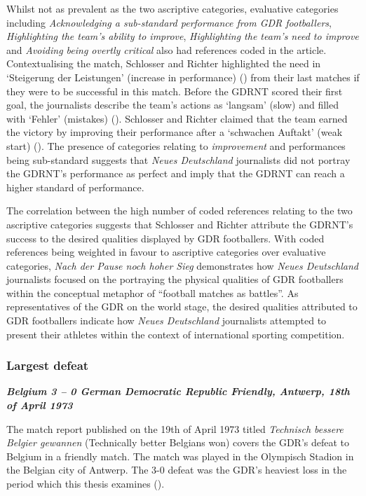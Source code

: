 Whilst not as prevalent as the two ascriptive categories, evaluative categories including \textit{Acknowledging a sub-standard performance from GDR footballers}, \textit{Highlighting the team’s ability to improve}, \textit{Highlighting the team’s need to improve} and \textit{Avoiding being overtly critical} also had references coded in the article. Contextualising the match, Schlosser and Richter highlighted the need in ‘Steigerung der Leistungen’ (increase in performance) (\cite{nd19721008}) from their last matches if they were to be successful in this match. Before the GDRNT scored their first goal, the journalists describe the team’s actions as ‘langsam’ (slow) and filled with ‘Fehler’ (mistakes) (\cite{nd19721008}). Schlosser and Richter claimed that the team earned the victory by improving their performance after a ‘schwachen Auftakt’ (weak start) (\cite{nd19721008}). The presence of categories relating to \textit{improvement} and performances being sub-standard suggests that \textit{Neues Deutschland} journalists did not portray the GDRNT’s performance as perfect and imply that the GDRNT can reach a higher standard of performance.

The correlation between the high number of coded references relating to the two ascriptive categories suggests that Schlosser and Richter attribute the GDRNT’s success to the desired qualities displayed by GDR footballers. With coded references being weighted in favour to ascriptive categories over evaluative categories, \textit{Nach der Pause noch hoher Sieg} demonstrates how \textit{Neues Deutschland} journalists focused on the portraying the physical qualities of GDR footballers within the conceptual metaphor of “football matches as battles”. As representatives of the GDR on the world stage, the desired qualities attributed to GDR footballers indicate how \textit{Neues Deutschland} journalists attempted to present their athletes within the context of international sporting competition.

\subsubsection*{Largest defeat}

\textbf{\textit{Belgium 3 – 0 German Democratic Republic
\newline Friendly, Antwerp, 18th of April 1973}}

The match report published on the 19th of April 1973 titled \textit{Technisch bessere Belgier gewannen} (Technically better Belgians won) covers the GDR’s defeat to Belgium in a friendly match. The match was played in the Olympisch Stadion in the Belgian city of Antwerp. The 3-0 defeat was the GDR’s heaviest loss in the period which this thesis examines (\cite{dähn2013}).

